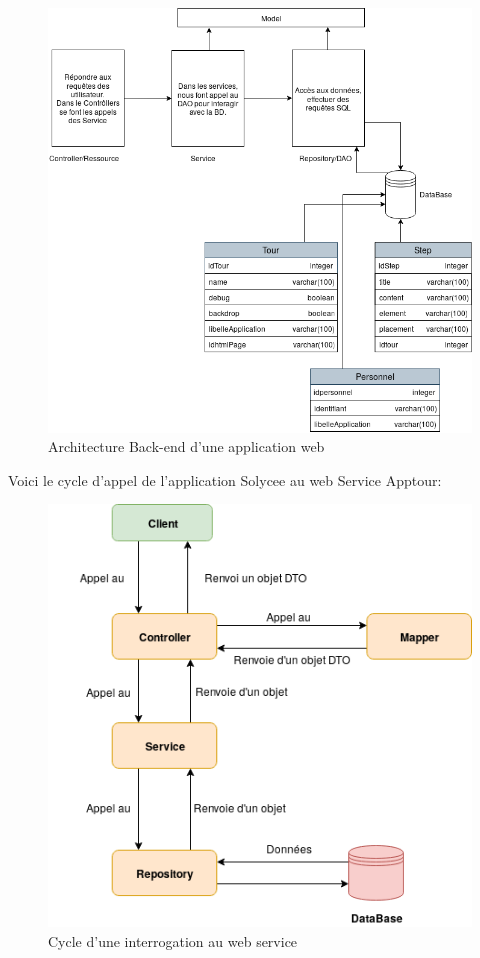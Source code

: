 \documentclass[12pt]{article}
\begin{document}
\begin{figure}[H]
	\centering
 		\includegraphics[width=1\textwidth]{diagrammes/Architecture_Apptour.png}
  		\caption{Architecture Back-end d'une application web}
	\end{figure}
	

Voici le cycle  d'appel de l'application Solycee au web Service Apptour:  

\begin{figure}[H]
	\centering
 		\includegraphics[width=1\textwidth]{diagrammes/schema_apptour.png}
  		\caption{Cycle d'une interrogation au web service}
	\end{figure}
\end{document}
